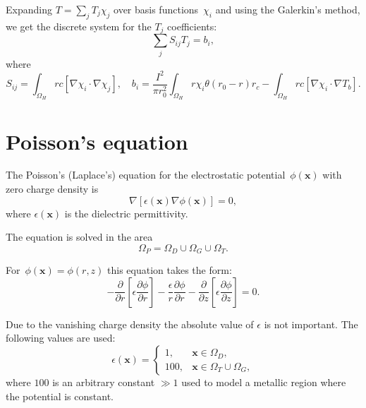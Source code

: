 \documentclass[10pt]{article}
\renewcommand{\vec}[1]{\mathbf{#1}}
\newcommand{\vx}{\vec{x}}
\begin{document}
Expanding $T = \sum_j T_j \chi_j$ over basis functions~$\chi_i$ and using
the Galerkin's method, we get the discrete system for the $T_j$ coefficients:
\begin{equation}
	\sum_j S_{ij} T_j = b_i,
\end{equation}
where
\begin{equation}
	S_{ij} = \int_{\Omega_H} r c [ \nabla\chi_i \cdot \nabla\chi_j ], \quad
	b_i = \frac{I^2}{\pi r_0^2} \int_{\Omega_H} r \chi_i \theta(r_0 - r) r_c
	- \int_{\Omega_H} r c [ \nabla\chi_i \cdot \nabla T_b ].
\end{equation}

\section{Poisson's equation}

The Poisson's (Laplace's) equation for the electrostatic potential~$\phi(\vx)$
with zero charge density is
\begin{equation}
	\nabla[ \epsilon(\vx) \nabla \phi(\vx) ] = 0,
\end{equation}
where $\epsilon(\vx)$ is the dielectric permittivity.

The equation is solved in the area
\begin{equation}
	\Omega_P = \Omega_D \cup \Omega_G \cup \Omega_T.
\end{equation}

For~$\phi(\vx) = \phi(r, z)$ this equation takes the form:
\begin{equation}
	\label{eq:poisson_equation_rz}
	- \frac{\partial}{\partial r} \left[ \epsilon \frac{\partial \phi}{\partial r} \right]
	- \frac{\epsilon}{r} \frac{\partial \phi}{\partial r}
	- \frac{\partial}{\partial z} \left[ \epsilon \frac{\partial \phi}{\partial z} \right]
	= 0.
\end{equation}

Due to the vanishing charge density the absolute value of $\epsilon$ is not
important. The following values are used:
\begin{equation}
	\epsilon(\vx) =
		\begin{cases}
			1, 		& \vx \in \Omega_D, \\
			100,	& \vx \in \Omega_T \cup \Omega_G,
		\end{cases}
\end{equation}
where $100$ is an arbitrary constant $\gg 1$ used to model a metallic region where
the potential is constant.
\end{document}

